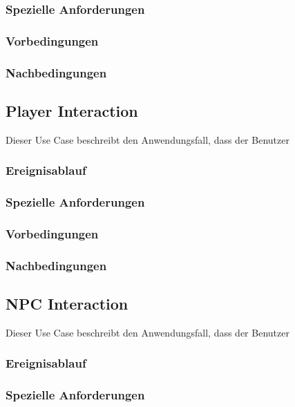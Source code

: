 		\subsubsection{Spezielle Anforderungen}		
			
		\subsubsection{Vorbedingungen}
			
		\subsubsection{Nachbedingungen}
	
	\subsection{Player Interaction}
		Dieser Use Case beschreibt den Anwendungsfall, dass der Benutzer 
			
		\subsubsection{Ereignisablauf}
			
		\subsubsection{Spezielle Anforderungen}		
			
		\subsubsection{Vorbedingungen}
			
		\subsubsection{Nachbedingungen}
	
	\subsection{NPC Interaction}
		Dieser Use Case beschreibt den Anwendungsfall, dass der Benutzer 
			
		\subsubsection{Ereignisablauf}
			
		\subsubsection{Spezielle Anforderungen}		
			
